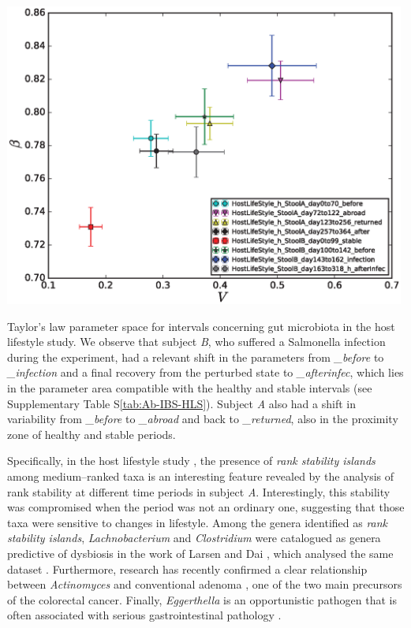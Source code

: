 \begin{supfig}
	\centering
	\includegraphics[width=0.99\textwidth]{figs/supfig_HLS_xWSummary.eps}
	\caption{Taylor's law parameter space for intervals concerning gut microbiota in the host lifestyle study\cite{hostlife}. We observe that subject \emph{B}, who suffered a Salmonella infection during the experiment, had a relevant shift in the parameters from \emph{\_before} to \emph{\_infection} and a final recovery from the perturbed state to \emph{\_afterinfec}, which lies in the parameter area compatible with the healthy and stable intervals (see Supplementary Table S\ref{tab:Ab-IBS-HLS}). Subject \emph{A} also had a shift in variability from \emph{\_before} to \emph{\_abroad} and back to \emph{\_returned}, also in the proximity zone of healthy and stable periods.}
	\label{supfig:HLS_xWSummary}
\end{supfig}
 
Specifically, in the host lifestyle study \cite{hostlife}, the presence of \emph{rank stability islands} among medium--ranked taxa is an interesting feature revealed by the analysis of rank stability at different time periods in subject \emph{A}. Interestingly, this stability was compromised when the period was not an ordinary one, suggesting that those taxa were sensitive to changes in lifestyle. Among the genera identified as \emph{rank stability islands}, \emph{Lachnobacterium} and \emph{Clostridium} were catalogued as genera predictive of dysbiosis in the work of Larsen and Dai \cite{rsi_dysbiosis}, which analysed the same dataset \cite{hostlife}. Furthermore, research has recently confirmed a clear relationship between \emph{Actinomyces} and conventional adenoma \cite{rsi_actino}, one of the two main precursors of the colorectal cancer. Finally, \emph{Eggerthella} is an opportunistic pathogen that is often associated with serious gastrointestinal pathology \cite{rsi_egg}.

